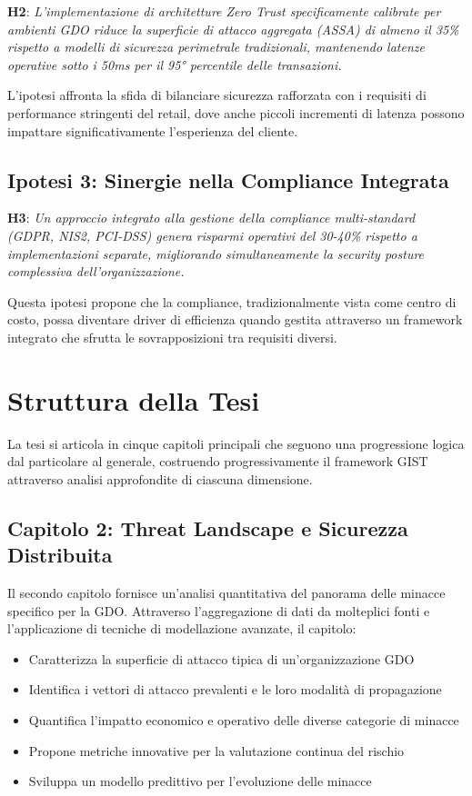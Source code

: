 \textbf{H2}: \textit{L'implementazione di architetture Zero Trust specificamente calibrate per ambienti GDO riduce la superficie di attacco aggregata (ASSA) di almeno il 35\% rispetto a modelli di sicurezza perimetrale tradizionali, mantenendo latenze operative sotto i 50ms per il 95° percentile delle transazioni.}

L'ipotesi affronta la sfida di bilanciare sicurezza rafforzata con i requisiti di performance stringenti del retail, dove anche piccoli incrementi di latenza possono impattare significativamente l'esperienza del cliente.

\subsection{Ipotesi 3: Sinergie nella Compliance Integrata}

\textbf{H3}: \textit{Un approccio integrato alla gestione della compliance multi-standard (GDPR, NIS2, PCI-DSS) genera risparmi operativi del 30-40\% rispetto a implementazioni separate, migliorando simultaneamente la security posture complessiva dell'organizzazione.}

Questa ipotesi propone che la compliance, tradizionalmente vista come centro di costo, possa diventare driver di efficienza quando gestita attraverso un framework integrato che sfrutta le sovrapposizioni tra requisiti diversi.

\section{Struttura della Tesi}

La tesi si articola in cinque capitoli principali che seguono una progressione logica dal particolare al generale, costruendo progressivamente il framework GIST attraverso analisi approfondite di ciascuna dimensione.

\subsection{Capitolo 2: Threat Landscape e Sicurezza Distribuita}

Il secondo capitolo fornisce un'analisi quantitativa del panorama delle minacce specifico per la GDO. Attraverso l'aggregazione di dati da molteplici fonti e l'applicazione di tecniche di modellazione avanzate, il capitolo:
\begin{itemize}
\item Caratterizza la superficie di attacco tipica di un'organizzazione GDO
\item Identifica i vettori di attacco prevalenti e le loro modalità di propagazione
\item Quantifica l'impatto economico e operativo delle diverse categorie di minacce
\item Propone metriche innovative per la valutazione continua del rischio
\item Sviluppa un modello predittivo per l'evoluzione delle minacce
\end{itemize}

